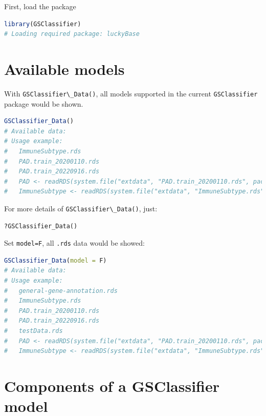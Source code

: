 \documentclass[
  12pt,
]{book}
\newcommand{\passthrough}[1]{#1}
\begin{document}
First, load the package

\begin{lstlisting}[language=R]
library(GSClassifier)
# Loading required package: luckyBase
\end{lstlisting}

\hypertarget{available-models}{%
\section{Available models}\label{available-models}}

With \passthrough{\lstinline!GSClassifier\_Data()!}, all models supported in the current \passthrough{\lstinline!GSClassifier!} package would be shown.

\begin{lstlisting}[language=R]
GSClassifier_Data()
# Available data:
# Usage example:
#   ImmuneSubtype.rds 
#   PAD.train_20200110.rds 
#   PAD.train_20220916.rds 
#   PAD <- readRDS(system.file("extdata", "PAD.train_20200110.rds", package = "GSClassifier")) 
#   ImmuneSubtype <- readRDS(system.file("extdata", "ImmuneSubtype.rds", package = "GSClassifier"))
\end{lstlisting}

For more details of \passthrough{\lstinline!GSClassifier\_Data()!}, just:

\begin{lstlisting}
?GSClassifier_Data()
\end{lstlisting}

Set \passthrough{\lstinline!model=F!}, all \passthrough{\lstinline!.rds!} data would be showed:

\begin{lstlisting}[language=R]
GSClassifier_Data(model = F)
# Available data:
# Usage example:
#   general-gene-annotation.rds 
#   ImmuneSubtype.rds 
#   PAD.train_20200110.rds 
#   PAD.train_20220916.rds 
#   testData.rds 
#   PAD <- readRDS(system.file("extdata", "PAD.train_20200110.rds", package = "GSClassifier")) 
#   ImmuneSubtype <- readRDS(system.file("extdata", "ImmuneSubtype.rds", package = "GSClassifier"))
\end{lstlisting}

\hypertarget{components-of-a-gsclassifier-model}{%
\section{Components of a GSClassifier model}\label{components-of-a-gsclassifier-model}}
\end{document}
